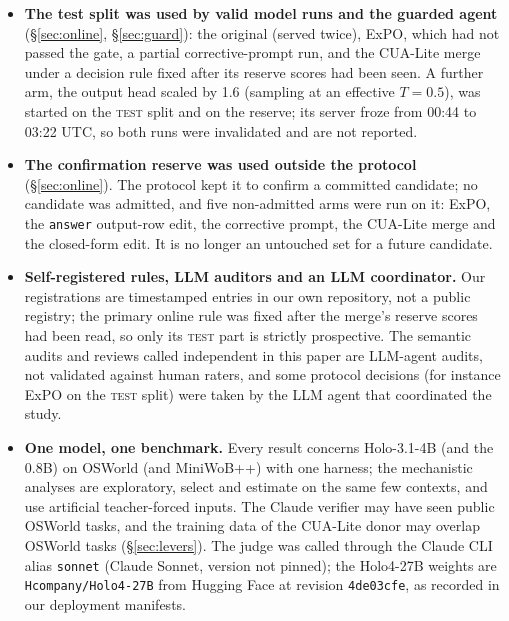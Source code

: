 \begin{itemize}
\item \textbf{The test split was used by \onNTestRuns{} valid model runs and the guarded agent} (\S\ref{sec:online}, \S\ref{sec:guard}): the original (served twice), ExPO, which had not passed the gate, a partial corrective-prompt run, and the CUA-Lite merge under a decision rule fixed after its reserve scores had been seen. A further arm, the output head scaled by 1.6 (sampling at an effective $T=0.5$), was started on the \textsc{test} split and on the reserve; its server froze from 00:44 to 03:22 UTC, so both runs were invalidated and are not reported. %
\item \textbf{The confirmation reserve was used outside the protocol} (\S\ref{sec:online}). The protocol kept it to confirm a committed candidate; no candidate was admitted, and five non-admitted arms were run on it: ExPO, the \texttt{answer} output-row edit, the corrective prompt, the CUA-Lite merge and the closed-form edit. It is no longer an untouched set for a future candidate.
\item \textbf{Self-registered rules, LLM auditors and an LLM coordinator.} Our registrations are timestamped entries in our own repository, not a public registry; the primary online rule was fixed after the merge's reserve scores had been read, so only its \textsc{test} part is strictly prospective. The semantic audits and reviews called independent in this paper are LLM-agent audits, not validated against human raters, and some protocol decisions (for instance ExPO on the \textsc{test} split) were taken by the LLM agent that coordinated the study.
\item \textbf{One model, one benchmark.} Every result concerns Holo-3.1-4B (and the 0.8B) on OSWorld (and MiniWoB++) with one harness; the mechanistic analyses are exploratory, select and estimate on the same few contexts, and use artificial teacher-forced inputs. The Claude verifier may have seen public OSWorld tasks, and the training data of the CUA-Lite donor may overlap OSWorld tasks (\S\ref{sec:levers}). The judge was called through the Claude CLI alias \texttt{sonnet} (Claude Sonnet, version not pinned); the Holo4-27B weights are \texttt{Hcompany/Holo4-27B} from Hugging Face at revision \texttt{4de03cfe}, as recorded in our deployment manifests. %

\end{itemize}
